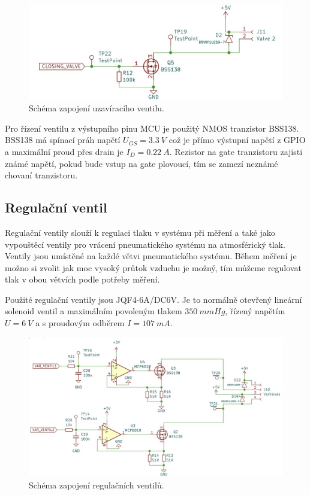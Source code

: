 \begin{figure}[H]
    \includegraphics[width=0.9\linewidth]{pictures/closing_valve_driver.jpg}
    \caption{Schéma zapojení uzavíracího ventilu.}
    \label{fig:closing_valve_driver}
\end{figure}

Pro řízení ventilu z výstupního pinu MCU je použitý NMOS tranzistor BSS138. BSS138 má spínací práh napětí $U_{GS} = 3.3 \ V$ což je přímo výstupní napětí z GPIO a maximální proud přes drain je $I_D = 0.22 \ A$.
Rezistor na gate tranzistoru zajisti známé napětí, pokud bude vstup na gate plovoucí, tím se zamezí neznámé chovaní tranzistoru.

\subsection{Regulační ventil}
Regulační ventily slouží k regulaci tlaku v systému při měření a také jako vypouštěcí ventily pro vrácení pneumatického systému na atmosférický tlak. Ventily jsou umístěné na každé větvi pneumatického systému. Během měření je možno si zvolit jak moc vysoký průtok vzduchu je možný, tím můžeme regulovat tlak v obou větvích podle potřeby měření. \par

Použité regulační ventily jsou JQF4-6A/DC6V. Je to normálně otevřený lineární solenoid ventil a maximálním povoleným tlakem $350 \ mmHg$, řízený napětím $U = 6 \ V$ a s proudovým odběrem $I = 107 \ mA$.\par

\begin{figure}[H]
    \includegraphics[width=1\linewidth]{pictures/var_valves.jpg}
    \caption{Schéma zapojení regulačních ventilů.}
    \label{fig:variable_valve_driver}
\end{figure}


